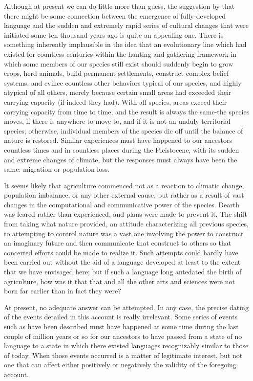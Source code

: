 Although at present we can do little more than guess, the suggestion by \citet{Hockett1973} that there might be some connection between the emergence of fully-developed language and the sudden and extremely rapid series of cultural changes that were initiated some ten thousand years ago is quite an appealing one. There is something inherently implausible in the idea that an evolutionary line which had existed for countless centuries within the hunting-and-gathering framework in which some members of our species still exist should suddenly begin to grow crops, herd animals, build permanent settlements, construct complex belief systems, and evince countless other behaviors typical of our species, and highly atypical of all others, merely because certain small areas had exceeded their carrying capacity (if indeed they had). With all species, areas exceed their carrying capacity from time to time, and the result is always the same-the species moves, if there is anywhere to move to, and if it is not an unduly territorial species; otherwise, individual members of the species die off until the balance of nature is restored. Similar experiences must have happened to our ancestors countless times and in countless places during the Pleistocene, with its sudden and extreme changes of climate, but the responses must always have been the same: migration or population loss.

It seems likely that agriculture commenced not as a reaction to climatic change, population imbalance, or any other external cause, but rather as a result of vast changes in the computational and com\-municative power of the species. Dearth was feared rather than experienced,
and plans were made to prevent it. The shift from taking what nature provided, an attitude characterizing all previous species, to attempting to control nature was a vast one involving the power to construct an imaginary future and then communicate that construct to others so that concerted efforts could be made to realize it. Such attempts could hardly have been carried out without the aid of a language developed at least to the extent that we have envisaged here; but if such a language long antedated the birth of agriculture, how was it that that and all the other arts and sciences were not born far earlier than in fact they were?

At present, no adequate answer can be attempted. In any case, the precise dating of the events detailed in this account is really irrelevant. Some series of events such as have been described must have happened at some time during the last couple of million years or so for our ancestors to have passed from a state of no language to a state in which there existed languages recognizably similar to those of today. When those events occurred is a matter of legitimate interest, but not one that can affect either positively or negatively the validity of the foregoing account.

